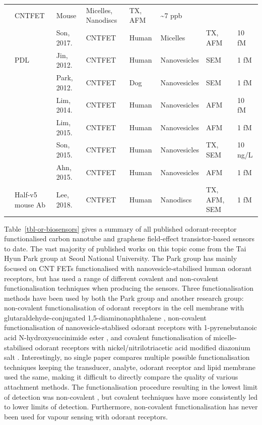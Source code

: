 \documentclass[
  a4paper,
]{scrbook}
\begin{document}
\begin{longtable}[]{@{}llllllll@{}}
& CNTFET & Mouse & Micelles, Nanodiscs & TX, AFM & \textasciitilde7
ppb \\
& & Son, 2017. \cite{Son2017} & CNTFET & Human & Micelles & TX, AFM & 10
fM \\
& PDL & Jin, 2012. \cite{Jin2012} & CNTFET & Human & Nanovesicles & SEM
& 1 fM \\
& & Park, 2012. \cite{Park2012a} & CNTFET & Dog & Nanovesicles & SEM & 1
fM \\
& & Lim, 2014. \cite{Lim2014} & CNTFET & Human & Nanovesicles & AFM & 10
fM \\
& & Lim, 2015. \cite{Lim2015} & CNTFET & Human & Nanovesicles & AFM & 1
fM \\
& & Son, 2015. \cite{Son2015} & CNTFET & Human & Nanovesicles & TX, SEM
& 10 ng/L \\
& & Ahn, 2015. \cite{Ahn2015} & CNTFET & Human & Nanovesicles & AFM & 1
fM \\
& Half-v5 mouse Ab & Lee, 2018. \cite{Lee2018} & CNTFET & Human &
Nanodiscs & TX, AFM, SEM & 1 fM \\
\end{longtable}

\newpage
{}

Table~\ref{tbl-or-biosensors} gives a summary of all published
odorant-receptor functionalised carbon nanotube and graphene
field-effect transistor-based sensors to date. The vast majority of
published works on this topic come from the Tai Hyun Park group at Seoul
National University. The Park group has mainly focused on CNT FETs
functionalised with nanovesicle-stabilised human odorant receptors, but
has used a range of different covalent and non-covalent
functionalisation techniques when producing the sensors. Three
functionalisation methods have been used by both the Park group and
another research group: non-covalent functionalisation of odorant
receptors in the cell membrane with glutaraldehyde-conjugated
1,5-diaminonaphthalene \autocite{Kwon2015,Goodwin2021}, non-covalent
functionalisation of nanovesicle-stablised odorant receptors with
1-pyrenebutanoic acid N-hydroxysuccinimide ester
\autocite{Murugathas2020,Yoo2022}, and covalent functionalisation of
micelle-stabilised odorant receptors with nickel/nitrilotriacetic acid
modified diazonium salt \autocite{Goldsmith2011,Son2017}. Interestingly,
no single paper compares multiple possible functionalisation techniques
keeping the transducer, analyte, odorant receptor and lipid membrane
used the same, making it difficult to directly compare the quality of
various attachment methods. The functionalisation procedure resulting in
the lowest limit of detection was non-covalent \autocite{Park2012}, but
covalent techniques have more consistently led to lower limits of
detection. Furthermore, non-covalent functionalisation has never been
used for vapour sensing with odorant receptors.
\end{document}
